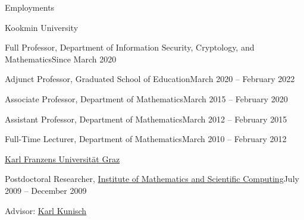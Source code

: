 \documentclass{resume} %
\begin{document}
\begin{rSection}{Employments}
\begin{rSubsection}{Kookmin University}{}{}{}
\item Full Professor, Department of Information Security, Cryptology, and Mathematics\hfill{Since March 2020}
\item Adjunct Professor, Graduated School of Education\hfill{March 2020 -- February 2022}
\item Associate Professor, Department of Mathematics\hfill{March 2015 -- February 2020}
\item Assistant Professor, Department of Mathematics\hfill{March 2012 -- February 2015}
\item Full-Time Lecturer, Department of Mathematics\hfill{March 2010 -- February 2012}%
\end{rSubsection}

\begin{rSubsection}{\href{https://www.uni-graz.at/en/}{Karl Franzens Universit{\"a}t Graz}}{}{}{}%
\item Postdoctoral Researcher, \href{https://mathematik.uni-graz.at/en/}{Institute of Mathematics and Scientific Computing}\hfill{July 2009 -- December 2009}
\item Advisor: \href{https://homepage.uni-graz.at/karl.kunisch/}{Karl Kunisch}
\end{rSubsection}
\end{rSection}
\end{document}
